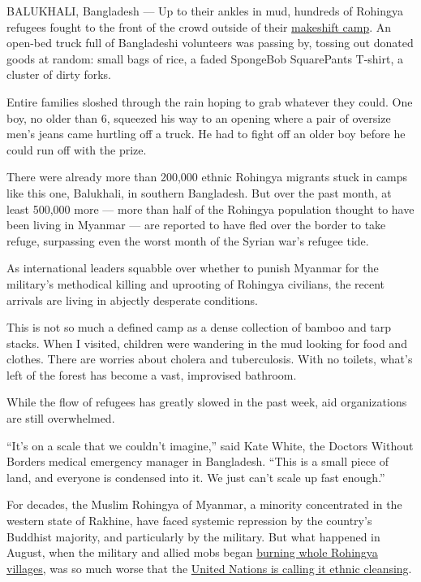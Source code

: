 BALUKHALI, Bangladesh --- Up to their ankles in mud, hundreds of
Rohingya refugees fought to the front of the crowd outside of their
\href{https://www.nytimes3xbfgragh.onion/video/world/asia/100000005453328/inside-a-refugee-camp-born-of-massacre.html?mcubz=1}{makeshift
camp}. An open-bed truck full of Bangladeshi volunteers was passing by,
tossing out donated goods at random: small bags of rice, a faded
SpongeBob SquarePants T-shirt, a cluster of dirty forks.

Entire families sloshed through the rain hoping to grab whatever they
could. One boy, no older than 6, squeezed his way to an opening where a
pair of oversize men's jeans came hurtling off a truck. He had to fight
off an older boy before he could run off with the prize.

There were already more than 200,000 ethnic Rohingya migrants stuck in
camps like this one, Balukhali, in southern Bangladesh. But over the
past month, at least 500,000 more --- more than half of the Rohingya
population thought to have been living in Myanmar --- are reported to
have fled over the border to take refuge, surpassing even the worst
month of the Syrian war's refugee tide.

As international leaders squabble over whether to punish Myanmar for the
military's methodical killing and uprooting of Rohingya civilians, the
recent arrivals are living in abjectly desperate conditions.

This is not so much a defined camp as a dense collection of bamboo and
tarp stacks. When I visited, children were wandering in the mud looking
for food and clothes. There are worries about cholera and tuberculosis.
With no toilets, what's left of the forest has become a vast, improvised
bathroom.

While the flow of refugees has greatly slowed in the past week, aid
organizations are still overwhelmed.

``It's on a scale that we couldn't imagine,'' said Kate White, the
Doctors Without Borders medical emergency manager in Bangladesh. ``This
is a small piece of land, and everyone is condensed into it. We just
can't scale up fast enough.''

For decades, the Muslim Rohingya of Myanmar, a minority concentrated in
the western state of Rakhine, have faced systemic repression by the
country's Buddhist majority, and particularly by the military. But what
happened in August, when the military and allied mobs began
\href{https://www.nytimes3xbfgragh.onion/interactive/2017/09/18/world/asia/rohingya-villages.html?_r=0}{burning
whole Rohingya villages}, was so much worse that the
\href{https://www.nytimes3xbfgragh.onion/2017/09/11/world/asia/myanmar-rohingya-ethnic-cleansing.html}{United
Nations is calling it ethnic cleansing}.

